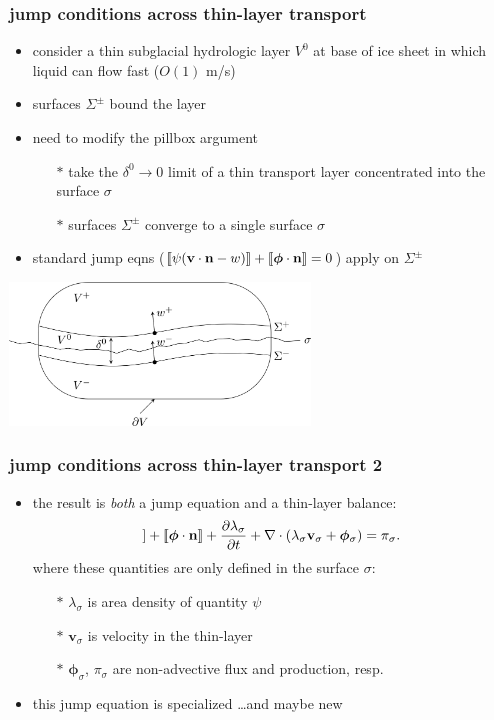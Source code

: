 \documentclass{beamer}
\newcommand {\jl}{[\![}
\newcommand {\jr}{]\!\hskip 0.003cm ]}
\newcommand{\bphi}{\boldsymbol{\phi}}
\newcommand{\bv}{\mathbf{v}}
\begin{document}
\begin{frame}
  \frametitle{jump conditions across thin-layer transport}
\small

\begin{itemize}
\item consider a thin subglacial hydrologic layer  $V^0$ at base of ice sheet in which liquid can flow fast ($O(1)$ m/s)
\item surfaces $\Sigma^\pm$ bound the layer
\item need to modify the pillbox argument
  \begin{itemize}
  \item[$\ast$] take the $\delta^0 \to 0$ limit of a thin transport layer concentrated into the surface $\sigma$
  \item[$\ast$] surfaces $\Sigma^\pm$ converge to a single surface $\sigma$
  \end{itemize}
\item standard jump eqns ($\jl \psi (\mathbf{v} \cdot \mathbf{n} - w) \jr + \jl \boldsymbol{\phi} \cdot \mathbf{n} \jr =0$) apply on  $\Sigma^\pm$
\end{itemize}

  \begin{center}
    \includegraphics[width=0.6\textwidth]{pillbox}
  \end{center}
\end{frame}


\begin{frame}
  \frametitle{jump conditions across thin-layer transport 2}

\begin{itemize}
\item the result is \emph{both} a jump equation and a thin-layer balance:
\begin{equation*}
\jl \psi (\mathbf{v} \cdot \mathbf{n} - w) \jr + \jl \boldsymbol{\phi} \cdot \mathbf{n} \jr + \frac{\partial \lambda_\sigma}{\partial t} + \nabla \cdot\left(\lambda_\sigma \bv_\sigma + \bphi_\sigma\right) = \pi_\sigma.
\end{equation*}
where these quantities are only defined in the surface $\sigma$:
  \begin{itemize}
  \item[$\ast$] $\lambda_\sigma$ is area density of quantity $\psi$
  \item[$\ast$] $\mathbf{v}_\sigma$ is velocity in the thin-layer
  \item[$\ast$] $\bphi_\sigma$, $\pi_\sigma$ are non-advective flux and production, resp.
  \end{itemize}
\item this jump equation is specialized \dots and maybe new
\end{itemize}
\end{frame}
\end{document}
